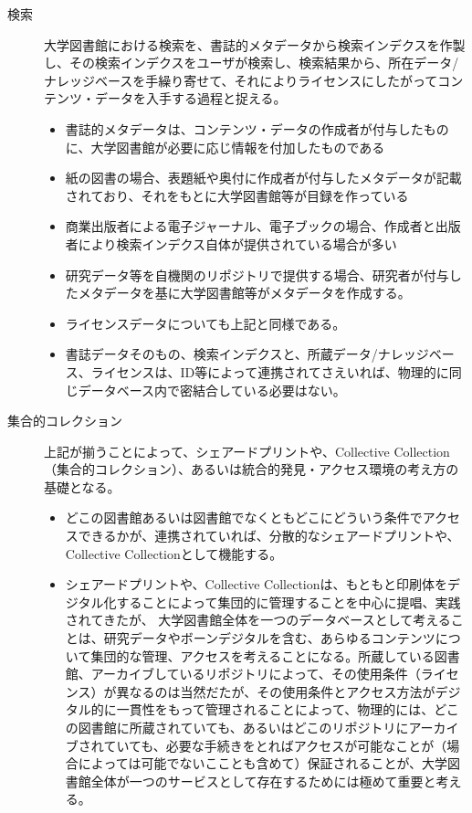\documentclass[submit,noauthor]{ono}
\begin{document}
\begin{description}
  \item[検索] 大学図書館における検索を、書誌的メタデータから検索インデクスを作製し、その検索インデクスをユーザが検索し、検索結果から、所在データ/ナレッジベースを手繰り寄せて、それによりライセンスにしたがってコンテンツ・データを入手する過程と捉える。
	\begin{itemize}
		\item 書誌的メタデータは、コンテンツ・データの作成者が付与したものに、大学図書館が必要に応じ情報を付加したものである
		\item 紙の図書の場合、表題紙や奥付に作成者が付与したメタデータが記載されており、それをもとに大学図書館等が目録を作っている
    \item  商業出版者による電子ジャーナル、電子ブックの場合、作成者と出版者により検索インデクス自体が提供されている場合が多い
		\item 研究データ等を自機関のリポジトリで提供する場合、研究者が付与したメタデータを基に大学図書館等がメタデータを作成する。
		\item ライセンスデータについても上記と同様である。
		\item 書誌データそのもの、検索インデクスと、所蔵データ/ナレッジベース、ライセンスは、ID等によって連携されてさえいれば、物理的に同じデータベース内で密結合している必要はない。
		\end{itemize}
	\end{description}

	\begin{description}
		\item[集合的コレクション] 上記が揃うことによって、シェアードプリントや、Collective Collection（集合的コレクション）、あるいは統合的発見・アクセス環境の考え方の基礎となる。
		\begin{itemize} 
			\item  どこの図書館あるいは図書館でなくともどこにどういう条件でアクセスできるかが、連携されていれば、分散的なシェアードプリントや、Collective Collectionとして機能する。
			\item シェアードプリントや、Collective Collectionは、もともと印刷体をデジタル化することによって集団的に管理することを中心に提唱、実践されてきたが、 \cite{dempsey} 大学図書館全体を一つのデータベースとして考えることは、研究データやボーンデジタルを含む、あらゆるコンテンツについて集団的な管理、アクセスを考えることになる。所蔵している図書館、アーカイブしているリポジトリによって、その使用条件（ライセンス）が異なるのは当然だたが、その使用条件とアクセス方法がデジタル的に一貫性をもって管理されることによって、物理的には、どこの図書館に所蔵されていても、あるいはどこのリポジトリにアーカイブされていても、必要な手続きをとればアクセスが可能なことが（場合によっては可能でないこことも含めて）保証されることが、大学図書館全体が一つのサービスとして存在するためには極めて重要と考える。
\end{itemize}
\end{description}
\end{document}
